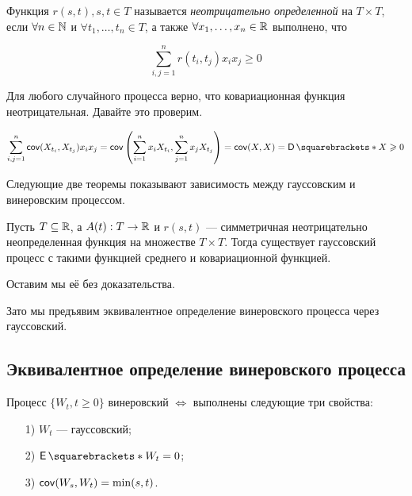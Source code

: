 \begin{definition}
  Функция $r(s, t), s, t \in T$ называется \textit{неотрицательно определенной}
  на $T \times T$,
  если $\forall n \in \mathbb{N}$ и $\forall t_1, \ldots, t_n \in T$, а также
  $\forall x_1, \ldots, x_n \in \mathbb{R}$ выполнено, что

  \[
    \sum\limits_{i, j = 1}^n r(t_i, t_j)x_ix_j \geq 0
  \]   
\end{definition}

Для любого случайного процесса верно, что ковариационная функция неотрицательная.
Давайте это проверим.

\[
  \sum\limits_{i, j = 1}^n \cov(X_{t_i}, X_{t_j})x_ix_j = 
  \cov\left(\sum\limits_{i = 1}^n x_iX_{t_i}, \sum\limits_{j = 1}^n x_jX_{t_j}\right) =
  \cov(X, X) = \D{X} \geq 0
\]

Следующие две теоремы показывают зависимость между гауссовским и винеровским
процессом.

\begin{theorem}
  Пусть $T \subseteq \mathbb{R}$, а $A(t): T \to \mathbb{R}$ и $r(s, t)$ --- симметричная неотрицательно
  неопределенная функция на множестве $T \times T$. Тогда существует гауссовский
  процесс с такими функцией среднего и ковариационной функцией.
\end{theorem}

Оставим мы её без доказательства.

Зато мы предъявим эквивалентное определение винеровского процесса через
гауссовский.

\subsection{Эквивалентное определение винеровского процесса}

\begin{theorem}
  Процесс $\{W_t, t \geq 0\}$ винеровский $\iff$ выполнены следующие три свойства:
  \begin{center}
    \begin{itemize}
      \centering
      \item[1)] $W_t$ --- гауссовский;
      \item[2)] $\E{W_t} = 0$;
      \item[3)] $\operatorname{\mathsf{cov}}(W_s, W_t) = \min(s, t)$.
    \end{itemize}
  \end{center}
\end{theorem}


